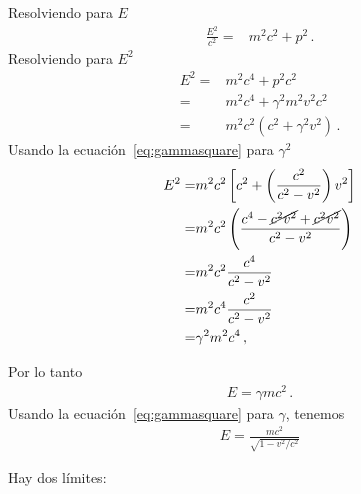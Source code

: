 \documentclass[11pt,a4paper]{article}
\begin{document}
Resolviendo para $E$
\begin{align*}
    \frac{E^2}{c^2} =& m^2c^2 + p^2\,.
\end{align*}
Resolviendo para $E^2$
\begin{align*}
        E^2 =& m^2 c^4 +  p^2c^2\\
         =& m^2 c^4 + \gamma^2 m^2 v^2 c^2\\
         =& m^2c^2(c^2+\gamma^2 v^2)\,.
\end{align*}
Usando la ecuación~\eqref{eq:gammasquare} para $\gamma^2$
\begin{align}
          E^2   =&m^2c^2\left[c^2+ \left(\frac{c^2}{c^2 - v^2}\right)v^2\right]\nonumber\\
         =& m^2 c^2\left(\frac{c^4-\cancel{c^2v^2}+\cancel{c^2v^2}}{c^2 - v^2}\right)\nonumber\\
         =& m^2c^2\frac{c^4}{c^2-v^2}\nonumber\\
         =& m^2c^4\frac{c^2}{c^2-v^2}\nonumber\\
         =& \gamma^2 m^2 c^4\,,
\end{align}

Por lo tanto
\begin{align}
    \boxed{E = \gamma m c^2\,.}
\end{align}
Usando la ecuación~\eqref{eq:gammasquare} para $\gamma$, tenemos
\begin{align}
    E = \frac{m c^2}{\sqrt{1-v^2/c^2}}
\end{align}

Hay dos límites:
\end{document}
